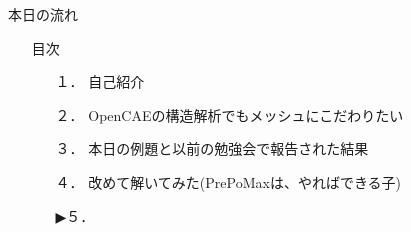 \begin{frame}{本日の流れ}
  \begin{itemize}
      \item[] 目次
      \begin{itemize}[itemsep=1.3ex, leftmargin=1cm]
        \item[１．] {\color{cud_lightgray} 自己紹介}
        \item[２．] {\color{cud_lightgray} OpenCAEの構造解析でもメッシュにこだわりたい}
        \item[３．] {\color{cud_lightgray} 本日の例題と以前の勉強会で報告された結果}
        \item[４．] {\color{cud_lightgray} 改めて解いてみた(PrePoMaxは、やればできる子)}
        \item[▶５．] 
      \end{itemize}
  \end{itemize}
\end{frame}
